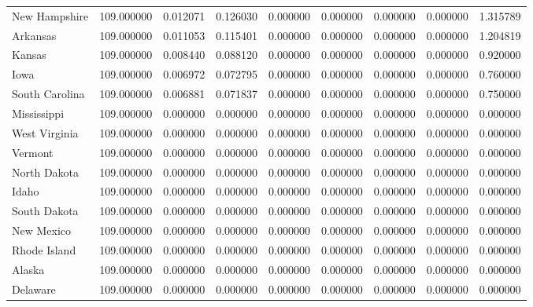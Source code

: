 \begin{tabular}{lrrrrrrrr}
New Hampshire & 109.000000 & 0.012071 & 0.126030 & 0.000000 & 0.000000 & 0.000000 & 0.000000 & 1.315789 \\
Arkansas & 109.000000 & 0.011053 & 0.115401 & 0.000000 & 0.000000 & 0.000000 & 0.000000 & 1.204819 \\
Kansas & 109.000000 & 0.008440 & 0.088120 & 0.000000 & 0.000000 & 0.000000 & 0.000000 & 0.920000 \\
Iowa & 109.000000 & 0.006972 & 0.072795 & 0.000000 & 0.000000 & 0.000000 & 0.000000 & 0.760000 \\
South Carolina & 109.000000 & 0.006881 & 0.071837 & 0.000000 & 0.000000 & 0.000000 & 0.000000 & 0.750000 \\
Mississippi & 109.000000 & 0.000000 & 0.000000 & 0.000000 & 0.000000 & 0.000000 & 0.000000 & 0.000000 \\
West Virginia & 109.000000 & 0.000000 & 0.000000 & 0.000000 & 0.000000 & 0.000000 & 0.000000 & 0.000000 \\
Vermont & 109.000000 & 0.000000 & 0.000000 & 0.000000 & 0.000000 & 0.000000 & 0.000000 & 0.000000 \\
North Dakota & 109.000000 & 0.000000 & 0.000000 & 0.000000 & 0.000000 & 0.000000 & 0.000000 & 0.000000 \\
Idaho & 109.000000 & 0.000000 & 0.000000 & 0.000000 & 0.000000 & 0.000000 & 0.000000 & 0.000000 \\
South Dakota & 109.000000 & 0.000000 & 0.000000 & 0.000000 & 0.000000 & 0.000000 & 0.000000 & 0.000000 \\
New Mexico & 109.000000 & 0.000000 & 0.000000 & 0.000000 & 0.000000 & 0.000000 & 0.000000 & 0.000000 \\
Rhode Island & 109.000000 & 0.000000 & 0.000000 & 0.000000 & 0.000000 & 0.000000 & 0.000000 & 0.000000 \\
Alaska & 109.000000 & 0.000000 & 0.000000 & 0.000000 & 0.000000 & 0.000000 & 0.000000 & 0.000000 \\
Delaware & 109.000000 & 0.000000 & 0.000000 & 0.000000 & 0.000000 & 0.000000 & 0.000000 & 0.000000 \\
\bottomrule
\end{tabular}
